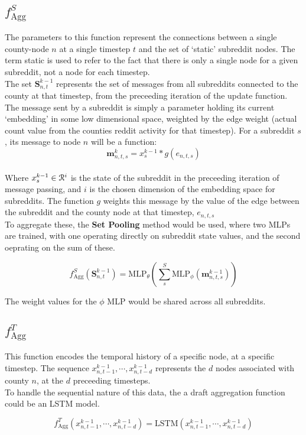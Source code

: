 \documentclass{article}
\begin{document}
\subsection{$f_{\text{Agg}}^S$}
The parameters to this function represent the connections between a single county-node $n$ at a single timestep $t$ and the set of `static' subreddit nodes. The term static is used to refer to the fact that there is only a single node for a given subreddit, not a node for each timestep. \\
The set $\textbf{S}_{n,t}^{k-1}$ represents the set of messages from all subreddits connected to the county at that timestep, from the preceeding iteration of the update function.\\
The message sent by a subreddit is simply a parameter holding its current `embedding' in some low dimensional space, weighted by the edge weight (actual count value from the counties reddit activity for that timestep). For a subreddit $s$, its message to node $n$ will be a function:
$$\textbf{m}_{n,t,s}^{k} = x_{s}^{k-1}*g(e_{n,t,s})$$\\
Where $x_{s}^{k-1} \in \EuScript{R}^i$ is the state of the subreddit in the preceeding iteration of message passing, and $i$ is the chosen dimension of the embedding space for subreddits. The function $g$ weights this message by the value of the edge between the subreddit and the county node at that timestep, $e_{n,t,s}$
\\
To aggregate these, the \textbf{Set Pooling} method would be used, where two MLPs are trained, with one operating directly on subreddit state values, and the second oeprating on the sum of these.

$$f_{\text{Agg}}^S(\textbf{S}_{n,t}^{k-1})=\text{MLP}_{\theta}\left(\sum_{s}^{S}\text{MLP}_\phi\left(\textbf{m}_{n,t,s}^{k-1}\right)\right)$$

The weight values for the $\phi$ MLP would be shared across all subreddits. 

\subsection{$f_{\text{Agg}}^T$}
This function encodes the temporal history of a specific node, at a specific timestep. The sequence $x_{n,t-1}^{k-1}, \cdots, x_{n, t-d}^{k-1}$ represents the $d$ nodes associated with county $n$, at the $d$ preceeding timesteps. \\
To handle the sequential nature of this data, the a draft aggregation function could be an LSTM model.

$$f_{\text{Agg}}^T(x_{n,t-1}^{k-1}, \cdots, x_{n, t-d}^{k-1}) = \text{LSTM}(x_{n,t-1}^{k-1}, \cdots, x_{n, t-d}^{k-1})$$
\end{document}
